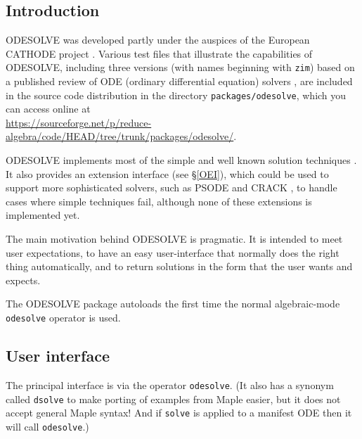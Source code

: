 
\newcommand{\odesolve}{\texttt{odesolve}}


\subsection{Introduction}

ODESOLVE \cite{MacCallum:88,MacCallum:ODESOLVE,Wright:97,Wright:99}
was developed partly under the auspices of the European CATHODE
project \cite{CATHODE}.  Various test files that illustrate the
capabilities of ODESOLVE, including three versions (with names
beginning with \texttt{zim}) based on a published review of ODE
(ordinary differential equation) solvers \cite{PostelZimmermann:96},
are included in the source code distribution in the directory
\texttt{packages/odesolve}, which you can access online at\\
\url{https://sourceforge.net/p/reduce-algebra/code/HEAD/tree/trunk/packages/odesolve/}.

ODESOLVE implements most of the simple and well known solution
techniques \cite{Zwillinger:92}.  It also provides an extension
interface (see \S\ref{OEI}), which could be used to support more
sophisticated solvers, such as PSODE
\cite{Man:94a,Man:97,PrelleSinger:83} and CRACK \cite{Brand:92}, to
handle cases where simple techniques fail, although none of these
extensions is implemented yet.

The main motivation behind ODESOLVE is pragmatic.  It is intended to
meet user expectations, to have an easy user-interface that normally
does the right thing automatically, and to return solutions in the
form that the user wants and expects.

The ODESOLVE package autoloads the first time the normal
algebraic-mode \odesolve{} operator is used.


\subsection{User interface}
\hypertarget{operator:ODESOLVE}{}
\hypertarget{operator:DSOLVE}{}

The principal interface is via the operator \odesolve.  (It also has a
synonym called \texttt{dsolve} to make porting of examples from Maple
easier, but it does not accept general Maple syntax!  And if
\texttt{solve} is applied to a manifest ODE then it will call
\odesolve.)


